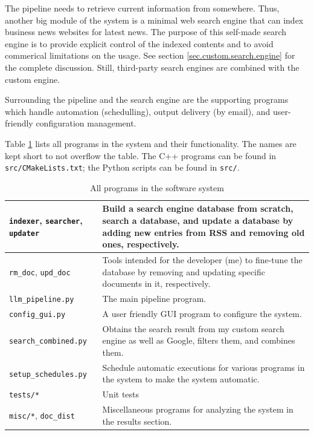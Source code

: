 \documentclass[final-report]{report-template}
\newcommand\ttb{\discretionary{}{}{}}
\begin{document}
The pipeline needs to retrieve current information from somewhere. Thus,
another big module of the system is a minimal web search engine that can index
business news websites for latest news. The purpose of this self-made search
engine is to provide explicit control of the indexed contents and to avoid
commerical limitations on the usage. See section \ref{sec.custom.search.engine}
for the complete discussion. Still, third-party search engines are combined
with the custom engine.

Surrounding the pipeline and the search engine are the supporting programs
which handle automation (schedulling), output delivery (by email),
and user-friendly configuration management.

Table \ref{table.all.programs} lists all programs in the system and their
functionality. The names are kept short to not overflow the table. The
C++ programs can be found in \texttt{src/\ttb CMakeLists.\ttb txt}; the Python
scripts can be found in \texttt{src/}.
\begin{table}[hbtp!]
\centering
\begin{tabular}{|p{4cm}|p{10cm}|}
	\hline
	\verb!indexer!, \verb!searcher!, \verb!updater! &
	Build a search engine database from scratch, search a database, and update a
	database by adding new entries from RSS and removing old ones,
	respectively. 
	\\ \hline
	\verb!rm_doc!, \verb!upd_doc! &
	Tools intended for the developer (me) to fine-tune the database by removing
	and updating specific documents in it, respectively.
	\\ \hline
	\verb!llm_pipeline.py! & The main pipeline program. 
	\\ \hline
	\verb!config_gui.py! & A user friendly GUI program to configure the system.
	\\ \hline
	\verb!search_combined.py! & Obtains the search result from my custom
	search engine as well as Google, filters them, and combines them.
	\\ \hline
	\verb!setup_schedules.py! & Schedule automatic executions for various
	programs in the system to make the system automatic.
	\\ \hline
	\verb!tests/*! & Unit tests	
	\\ \hline
	\verb!misc/*!, \texttt{doc\_\ttb dist} & Miscellaneous programs for
	analyzing the system in the results section.
	\\ \hline
\end{tabular}
\caption{All programs in the software system}
\label{table.all.programs}
\end{table}
\end{document}
